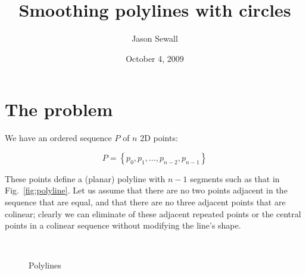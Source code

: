 \documentclass{article}
\title{Smoothing polylines with circles}
\author{Jason Sewall}
\date{October 4, 2009}
\begin{document}
\maketitle

\section{The problem}
We have an ordered sequence $P$ of $n$ 2D points:

\begin{equation}
  \label{eq:points}
  P = \left\{p_{0}, p_{1},\ldots,p_{n-2},p_{n-1}\right\}
\end{equation}

These points define a (planar) polyline with $n-1$ segments such as that in Fig.~\ref{fig:polyline}.  Let us assume that there are no two points adjacent in the sequence that are equal, and that there are no three adjacent points that are colinear; clearly we can eliminate of these adjacent repeated points or the central points in a colinear sequence without modifying the line's shape.

\begin{figure}[h]
  \centering
  \hfill
  \\
  \caption{Polylines}
\end{figure}
\end{document}
